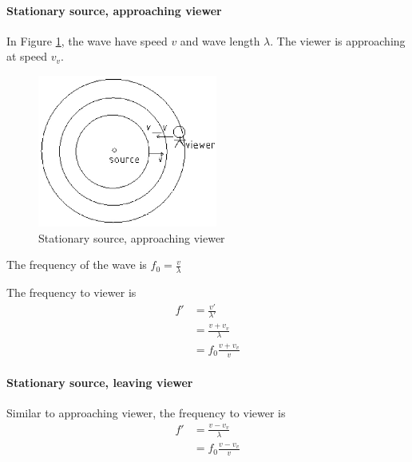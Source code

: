         \paragraph{Stationary source, approaching viewer}
            In Figure \ref{de_ssav}, the wave have speed $v$ and wave length $\lambda$. The viewer is approaching at speed $v_v$. 
            \begin{figure}[H]
                \begin{center}
                    \includegraphics[height=5cm]{wave_charts/dopeff_sta_sou_app_vie.eps}
                \end{center}
                \caption{Stationary source, approaching viewer}
                \label{de_ssav}
            \end{figure}

            The frequency of the wave is $f_0 = \frac{v}{\lambda}$

            The frequency to viewer is
            \begin{align}
                f' &= \frac{v'}{\lambda'} \\
                   &= \frac{v + v_v}{\lambda} \\
                   &= f_0 \frac{v + v_v}{v}
            \end{align}

        \paragraph{Stationary source, leaving viewer}
            Similar to approaching viewer, the frequency to viewer is
            \begin{align}
                f' &= \frac{v - v_v}{\lambda} \\
                   &= f_0 \frac{v - v_v}{v}
            \end{align}

